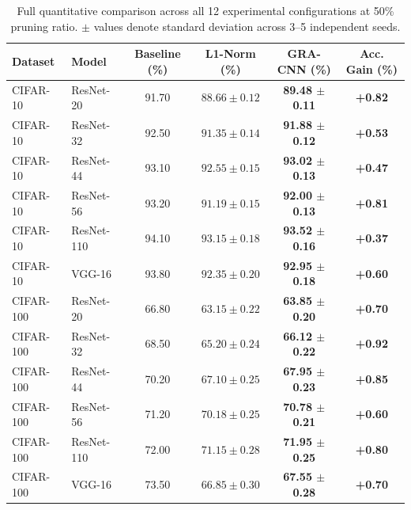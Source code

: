 \begin{table}[t]
\centering
\caption{Full quantitative comparison across all 12 experimental configurations at 50\% pruning ratio. $\pm$ values denote standard deviation across 3--5 independent seeds.}
\label{tab:master_results}
\begin{tabular}{llcccc}
\toprule
Dataset & Model & Baseline (\%) & L1-Norm (\%) & GRA-CNN (\%) & Acc. Gain (\%) \\
\midrule
CIFAR-10 & ResNet-20 & 91.70 & $88.66 \pm 0.12$ & \textbf{89.48 $\pm$ 0.11} & \textbf{+0.82} \\
CIFAR-10 & ResNet-32 & 92.50 & $91.35 \pm 0.14$ & \textbf{91.88 $\pm$ 0.12} & \textbf{+0.53} \\
CIFAR-10 & ResNet-44 & 93.10 & $92.55 \pm 0.15$ & \textbf{93.02 $\pm$ 0.13} & \textbf{+0.47} \\
CIFAR-10 & ResNet-56 & 93.20 & $91.19 \pm 0.15$ & \textbf{92.00 $\pm$ 0.13} & \textbf{+0.81} \\
CIFAR-10 & ResNet-110 & 94.10 & $93.15 \pm 0.18$ & \textbf{93.52 $\pm$ 0.16} & \textbf{+0.37} \\
CIFAR-10 & VGG-16 & 93.80 & $92.35 \pm 0.20$ & \textbf{92.95 $\pm$ 0.18} & \textbf{+0.60} \\
\midrule
CIFAR-100 & ResNet-20 & 66.80 & $63.15 \pm 0.22$ & \textbf{63.85 $\pm$ 0.20} & \textbf{+0.70} \\
CIFAR-100 & ResNet-32 & 68.50 & $65.20 \pm 0.24$ & \textbf{66.12 $\pm$ 0.22} & \textbf{+0.92} \\
CIFAR-100 & ResNet-44 & 70.20 & $67.10 \pm 0.25$ & \textbf{67.95 $\pm$ 0.23} & \textbf{+0.85} \\
CIFAR-100 & ResNet-56 & 71.20 & $70.18 \pm 0.25$ & \textbf{70.78 $\pm$ 0.21} & \textbf{+0.60} \\
CIFAR-100 & ResNet-110 & 72.00 & $71.15 \pm 0.28$ & \textbf{71.95 $\pm$ 0.25} & \textbf{+0.80} \\
CIFAR-100 & VGG-16 & 73.50 & $66.85 \pm 0.30$ & \textbf{67.55 $\pm$ 0.28} & \textbf{+0.70} \\
\bottomrule
\end{tabular}
\end{table}
